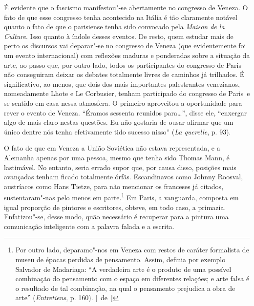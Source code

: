 É evidente que o fascismo manifestou"-se abertamente no congresso de
Veneza. O fato de que esse congresso tenha acontecido na Itália é tão
claramente notável quanto o fato de que o parisiense tenha
sido convocado pela \emph{Maison de la Culture}. Isso quanto à índole
desses eventos. De resto, quem estudar mais de perto os
discursos vai deparar"-se no congresso de Veneza (que evidentemente foi um
evento internacional) com reflexões maduras e ponderadas sobre a
situação da arte, ao passo que, por outro lado, todos
os participantes do congresso de Paris não conseguiram deixar os
debates totalmente livres de caminhos já trilhados. É significativo, ao
menos, que dois dos mais importantes palestrantes venezianos, nomeadamente Lhote e Le Corbusier, tenham
participado do congresso de Paris~e se sentido em casa nessa atmosfera.
O primeiro aproveitou a oportunidade para
rever o evento de Veneza. ``Éramos sessenta reunidos
para\ldots{}'', disse ele, ``enxergar algo de mais claro nestas questões.
Eu não gostaria de ousar afirmar que um único dentre nós tenha
efetivamente tido sucesso nisso'' (\emph{La querelle}, p. 93).

O fato de que em Veneza a União Soviética não estava representada, e a
Alemanha apenas por uma pessoa, mesmo que tenha sido Thomas Mann, é
lastimável. No entanto, seria errado supor que, por causa disso,
posições mais avançadas tenham ficado totalmente órfãs. Escandinavos
como Johnny Roosval, austríacos como Hans Tietze, para não mencionar os
franceses já citados, sustentaram"-nas pelo menos em parte.\footnote{Por
  outro lado, deparamo"-nos em Veneza com restos de caráter formalista de
  museu de épocas perdidas de pensamento. Assim, definia por exemplo
  Salvador de Madariaga: ``A verdadeira arte é o produto de uma possível
  combinação do pensamento com o espaço em diferentes relações; e arte
  falsa é o resultado de tal combinação, na qual o pensamento prejudica
  a obra de arte'' (\emph{Entretiens}, p. 160). [~de~]} Em Paris, a vanguarda, composta
em igual proporção de pintores e escritores,
obteve, em todo caso, a primazia. Enfatizou"-se, desse modo, quão
necessário é recuperar para a pintura uma comunicação inteligente com a
palavra falada e a escrita.

